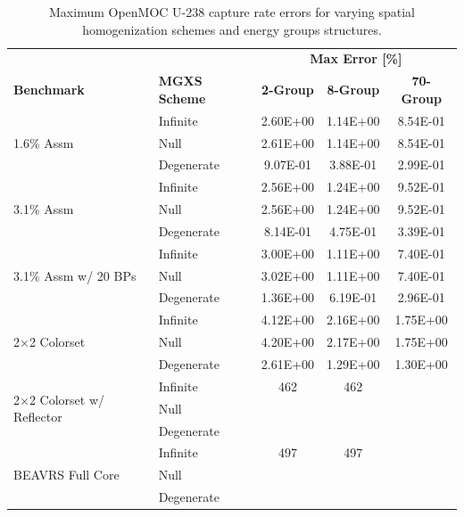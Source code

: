 \begin{table}[h!]
  \centering
  \caption[Maximum OpenMOC U-238 capture rate errors]{Maximum OpenMOC U-238 capture rate errors for varying spatial homogenization schemes and energy groups structures.}
  \small
  \label{table:chap8-openmoc-max-capt-rates}
  \vspace{6pt}
  \begin{tabular}{l l c c c}
  \toprule
  \rowcolor{lightgray}
  & & \multicolumn{3}{c}{\cellcolor{lightgray} \textbf{Max Error [\%]}} \\
  \multirow{-2}{*}{\cellcolor{lightgray} \bf Benchmark} &
  \multirow{-2}{*}{\cellcolor{lightgray} \bf \ac{MGXS} Scheme} &
  {\cellcolor{lightgray} \bf 2-Group} &
  {\cellcolor{lightgray} \bf 8-Group} &
  {\cellcolor{lightgray} \bf 70-Group} \\
  \midrule
\multirow{3}{*}{\parbox{2.5cm}{1.6\% Assm}} & Infinite & 2.60E+00 & 1.14E+00 & 8.54E-01 \\
& Null & 2.61E+00 & 1.14E+00 & 8.54E-01 \\
& Degenerate & 9.07E-01 & 3.88E-01 & 2.99E-01 \\
  \midrule
\multirow{3}{*}{\parbox{2.5cm}{3.1\% Assm}} & Infinite & 2.56E+00 & 1.24E+00 & 9.52E-01 \\
& Null & 2.56E+00 & 1.24E+00 & 9.52E-01 \\
& Degenerate & 8.14E-01 & 4.75E-01 & 3.39E-01 \\
  \midrule
\multirow{3}{*}{\parbox{2.5cm}{3.1\% Assm w/ 20 BPs}} & Infinite & 3.00E+00 & 1.11E+00 & 7.40E-01 \\
& Null & 3.02E+00 & 1.11E+00 & 7.40E-01 \\
& Degenerate & 1.36E+00 & 6.19E-01 & 2.96E-01 \\
  \midrule
  \multirow{3}{*}{\parbox{2.5cm}{2$\times$2 Colorset}} & Infinite & 4.12E+00 & 2.16E+00 & 1.75E+00 \\
& Null & 4.20E+00 & 2.17E+00 & 1.75E+00 \\
& Degenerate & 2.61E+00 & 1.29E+00 & 1.30E+00 \\
  \midrule
  \multirow{3}{*}{\parbox{2.3cm}{2$\times$2 Colorset w/ Reflector}} & Infinite & 462 & 462 & \\
  & Null & & & \\
  & Degenerate & & & \\
  \midrule
  \multirow{3}{*}{\parbox{2cm}{\ac{BEAVRS} Full Core}} & Infinite & 497 & 497 & \\
  & Null & & & \\
  & Degenerate & & & \\
  \bottomrule
\end{tabular}
\end{table}

